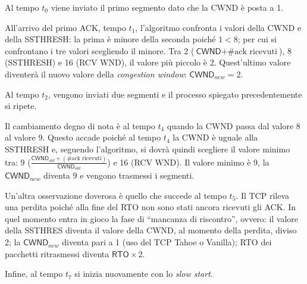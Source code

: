 \documentclass[a4paper]{article}
\newcommand{\dquotes}[1]{``#1''}
\begin{document}
	\noindent
	Al tempo $t_{0}$ viene inviato il primo segmento dato che la \textsf{CWND} è posta a 1.\newline
	
	\noindent
	All’arrivo del primo \textsf{ACK}, tempo $t_{1}$, l’algoritmo confronta i valori della \textsf{CWND} e della \textsf{SSTHRESH}: la prima è minore della seconda poiché $1 < 8$; per cui si confrontano i tre valori scegliendo il minore. Tra 2 ($\textsf{CWND} + \text{\#ack ricevuti}$), 8 (\textsf{SSTHRESH}) e 16 (\textsf{RCV WND}), il valore più piccolo è 2. Quest’ultimo valore diventerà il nuovo valore della \emph{congestion window}: $\textsf{CWND}_{new} = 2$.\newline
	
	\noindent
	Al tempo $t_{2}$, vengono inviati due segmenti e il processo spiegato precedentemente si ripete.\newline
	
	\noindent
	Il cambiamento degno di nota è al tempo $t_{4}$ quando la \textsf{CWND} passa dal valore 8 al valore 9. Questo accade poiché al tempo $t_{4}$ la \textsf{CWND} è uguale alla \textsf{SSTHRESH} e, seguendo l’algoritmo, si dovrà quindi scegliere il valore minimo tra: 9 ($\frac{\textsf{CWND}_{old} + \left(\text{\#ack ricevuti}\right)}{\textsf{CWND}_{old}}$) e 16 (\textsf{RCV WND}). Il valore minimo è 9, la $\textsf{CWND}_{new}$ diventa 9 e vengono trasmessi i segmenti.\newline
	
	\noindent
	Un’altra osservazione doverosa è quello che succede al tempo $t_{5}$. Il TCP rileva una perdita poiché alla fine del \textsf{RTO} non sono stati ancora ricevuti gli \textsf{ACK}. In quel momento entra in gioco la fase di \dquotes{mancanza di riscontro}, ovvero: il valore della \textsf{SSTHRES} diventa il valore della \textsf{CWND}, al momento della perdita, diviso 2; la $\textsf{CWND}_{new}$ diventa pari a 1 (uso del TCP Tahoe o Vanilla); \textsf{RTO} dei pacchetti ritrasmessi diventa $\textsf{RTO} \times 2$.\newline
	
	\noindent
	Infine, al tempo $t_{7}$ si inizia nuovamente con lo \emph{slow start}.\newpage
	
\end{document}
